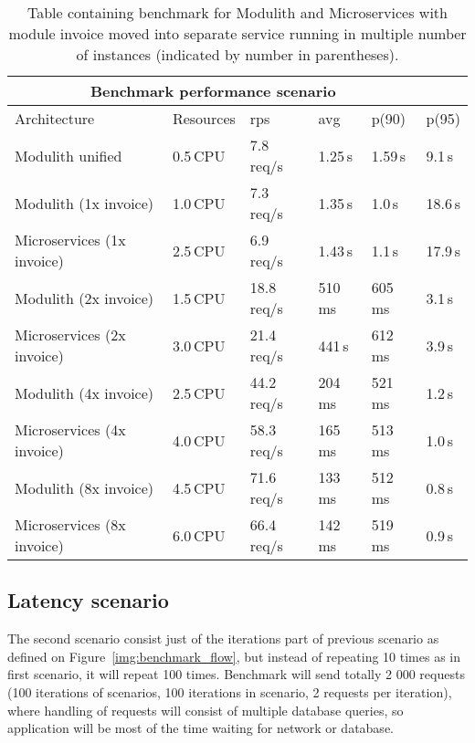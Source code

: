 \begin{table}
    \begin{tabular}{ |p{4cm}||p{1.6cm}|p{1.5cm}|p{1.5cm}|p{1.5cm}|p{1.5cm}| }
        \hline
        \multicolumn{5}{|c|}{Benchmark performance scenario}                                  \\
        \hline
        Architecture                & Resources & rps         & avg     & p(90)   & p(95)   \\
        \hline
        Modulith unified            & 0.5\,CPU  & 7.8\,req/s  & 1.25\,s & 1.59\,s & 9.1\,s  \\
        \rowcolor{Gray}
        Modulith (1x invoice)       & 1.0\,CPU  & 7.3\,req/s  & 1.35\,s & 1.0\,s  & 18.6\,s \\
        \rowcolor{Gray}
        Microservices (1x invoice)  & 2.5\,CPU  & 6.9\,req/s  & 1.43\,s & 1.1\,s  & 17.9\,s \\
        Modulith (2x invoice)       & 1.5\,CPU  & 18.8\,req/s & 510\,ms & 605\,ms & 3.1\,s  \\
        Microservices (2x invoice)  & 3.0\,CPU  & 21.4\,req/s & 441\,s  & 612\,ms & 3.9\,s  \\
        \rowcolor{Gray}
        Modulith (4x invoice)       & 2.5\,CPU  & 44.2\,req/s & 204\,ms & 521\,ms & 1.2\,s  \\
        \rowcolor{Gray}
        Microservices  (4x invoice) & 4.0\,CPU  & 58.3\,req/s & 165\,ms & 513\,ms & 1.0\,s  \\
        Modulith (8x invoice)       & 4.5\,CPU  & 71.6\,req/s & 133\,ms & 512\,ms & 0.8\,s  \\
        Microservices (8x invoice)  & 6.0\,CPU  & 66.4\,req/s & 142\,ms & 519\,ms & 0.9\,s  \\
        \hline
    \end{tabular}
    \caption{Table containing benchmark for Modulith and Microservices with module invoice moved into separate service running in multiple number of instances (indicated by number in parentheses).\label{table:benchmark_modulith_instances}}
\end{table}


\subsection{Latency scenario}
The second scenario consist just of the iterations part of previous scenario as defined on Figure~\ref{img:benchmark_flow}, but instead of repeating 10 times as in first scenario, it will repeat 100 times. Benchmark will send totally 2 000 requests (100 iterations of scenarios, 100 iterations in scenario, 2 requests per iteration), where handling of requests will consist of multiple database queries, so application will be most of the time waiting for network or database.

